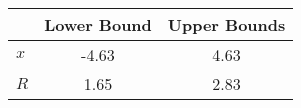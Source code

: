 \begin{tiny}\begin{tabular}{|l|c|c|}
\hline
&\textbf{Lower Bound}&\textbf{Upper Bounds}\\\hline
\textbf{$x$}&-4.63&4.63\\\hline
\textbf{$R$}&1.65&2.83\\\hline
\end{tabular}
\end{tiny}
